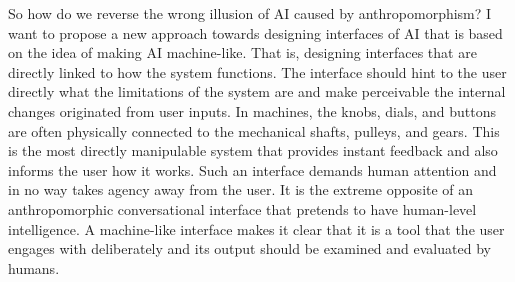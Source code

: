 \documentclass[12pt]{article}
\begin{document}
So how do we reverse the wrong illusion of AI caused by anthropomorphism? I want to propose a new approach towards designing interfaces of AI that is based on the idea of making AI machine-like. That is, designing interfaces that are directly linked to how the system functions. The interface should hint to the user directly what the limitations of the system are and make perceivable the internal changes originated from user inputs. In machines, the knobs, dials, and buttons are often physically connected to the mechanical shafts, pulleys, and gears. This is the most directly manipulable system that provides instant feedback and also informs the user how it works. Such an interface demands human attention and in no way takes agency away from the user. It is the extreme opposite of an anthropomorphic conversational interface that pretends to have human-level intelligence. A machine-like interface makes it clear that it is a tool that the user engages with deliberately and its output should be examined and evaluated by humans.
\end{document}
